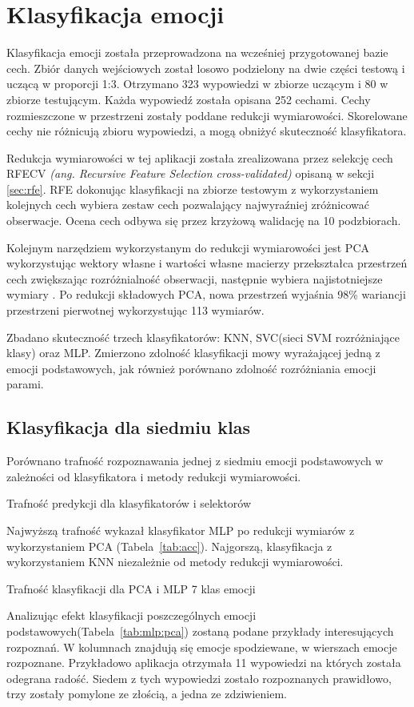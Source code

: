 \documentclass[a4paper,12pt,twoside,openany]{report}
\newcommand{\ang}[1]{\textit{(ang. #1)}}
\newcommand{\Tab}[1]{(Tabela~\ref{#1})}
\begin{document}
\section{Klasyfikacja emocji}
Klasyfikacja emocji została przeprowadzona na wcześniej przygotowanej bazie cech.
Zbiór danych wejściowych został losowo podzielony na dwie części testową i uczącą w proporcji 1:3.
Otrzymano 323 wypowiedzi w zbiorze uczącym i 80 w zbiorze testującym.
Każda wypowiedź została opisana 252 cechami.
Cechy rozmieszczone w przestrzeni zostały poddane redukcji wymiarowości. 
Skorelowane cechy nie różnicują zbioru wypowiedzi, a mogą obniżyć skuteczność klasyfikatora.

Redukcja wymiarowości w tej aplikacji została zrealizowana przez selekcję cech RFECV \ang{Recursive Feature Selection cross-validated} \cite{Guyon2002}
opisaną w sekcji \ref{sec:rfe}.
RFE dokonując klasyfikacji na zbiorze testowym z wykorzystaniem kolejnych cech wybiera zestaw cech pozwalający najwyraźniej zróżnicować obserwacje.
Ocena cech odbywa się przez krzyżową walidację na 10 podzbiorach.


Kolejnym narzędziem wykorzystanym do redukcji wymiarowości jest PCA wykorzystując wektory własne i wartości własne macierzy
przekształca przestrzeń cech zwiększając rozróżnialność obserwacji, następnie wybiera najistotniejsze wymiary \cite{Bro2014}.
Po redukcji składowych PCA, nowa przestrzeń wyjaśnia 98\% wariancji przestrzeni pierwotnej wykorzystując 113 wymiarów.

Zbadano skuteczność trzech klasyfikatorów: KNN, SVC(sieci SVM rozróżniające klasy) oraz MLP.
Zmierzono zdolność klasyfikacji mowy wyrażającej jedną z emocji podstawowych, jak również porównano zdolność rozróżniania emocji parami.

\subsection{Klasyfikacja dla siedmiu klas}
Porównano trafność rozpoznawania jednej z siedmiu emocji podstawowych w zależności od klasyfikatora i metody redukcji wymiarowości.
\begin{table}[hc!]
	\caption{Trafność predykcji dla klasyfikatorów i selektorów}
	\centering
	
	\label{tab:acc}
\end{table}
Najwyższą trafność wykazał klasyfikator MLP po redukcji wymiarów z wykorzystaniem PCA \Tab{tab:acc}. 
Najgorszą, klasyfikacja z wykorzystaniem KNN niezależnie od metody redukcji wymiarowości.
\begin{landscape}
\begin{table}[hc!]
	\caption{Trafność klasyfikacji dla PCA i MLP 7 klas emocji}
	\centering
	
	\label{tab:mlp:pca}
\end{table}
\end{landscape}
Analizując efekt klasyfikacji poszczególnych emocji podstawowych\Tab{tab:mlp:pca} zostaną podane przykłady interesujących rozpoznań.
W kolumnach znajdują się emocje spodziewane, w wierszach emocje rozpoznane.
Przykładowo aplikacja otrzymała 11 wypowiedzi na których została odegrana radość.
Siedem z tych wypowiedzi zostało rozpoznanych prawidłowo, trzy zostały pomylone ze złością, a jedna ze zdziwieniem.
\end{document}
